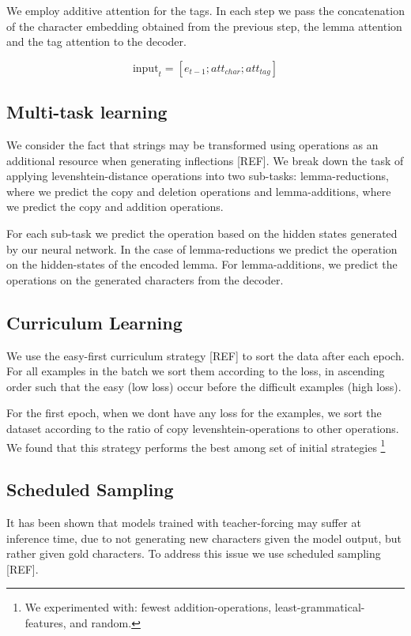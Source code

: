 \documentclass[11pt,a4paper]{article}
\begin{document}
We employ additive attention for the tags. In each step we pass the
concatenation of the character embedding obtained from the previous
step, the lemma attention and the tag attention to the decoder.

\begin{equation*}
\text{input}_t = [e_{t-1}; att_{char}; att_{tag}]
\end{equation*}



\subsection{Multi-task learning}

We consider the fact that strings may be transformed using operations
as an additional resource when generating inflections [REF]. 
We break down the task of applying levenshtein-distance operations
into two sub-tasks: lemma-reductions, where we predict the copy and
deletion operations and lemma-additions, where we predict the copy and
addition operations. 

For each sub-task we predict the operation based on the hidden states
generated by our neural network. In the case of lemma-reductions we
predict the operation on the hidden-states of the encoded lemma. For
lemma-additions, we predict the operations on the generated characters
from the decoder.

\subsection{Curriculum Learning}

We use the easy-first curriculum strategy [REF] to sort the data after
each epoch. For all examples in the batch we sort them according to
the loss, in ascending order such that the easy (low loss) occur
before the difficult examples (high loss).  

For the first epoch, when we dont have any loss for the examples, we
sort the dataset according to the ratio of copy levenshtein-operations
to other operations. We found that this strategy performs the best
among set of initial strategies \footnote{We experimented with: fewest
addition-operations, least-grammatical-features, and random.}

\subsection{Scheduled Sampling}

It has been shown that models trained with teacher-forcing may suffer
at inference time, due to not generating new characters given the
model output, but rather given gold characters. To address this issue
we use scheduled sampling [REF]. 
\end{document}
